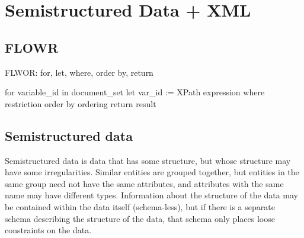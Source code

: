 \documentclass[10pt]{article}
\begin{document}
  \section*{Semistructured Data + XML}
    \subsection*{FLOWR}
    FLWOR: for, let, where, order by, return

    for variable_id in document_set 
    let var_id := XPath expression 
    where restriction
    order by ordering
    return result
    \subsection*{Semistructured data}
        Semistructured data is data that has some structure, but whose structure may have some irregularities. Similar entities are grouped together, but entities in the same group need not have the same attributes, and attributes with the same name may have different types.
        Information about the structure of the data may be contained within the data itself (schema-less), but if there is a separate schema describing the structure of the data, that schema only places loose constraints on the data.
\end{document}
